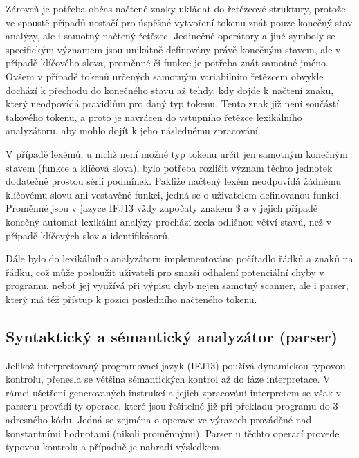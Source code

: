 \documentclass[12pt,a4paper,titlepage,final]{article}
\begin{document}
Zároveň je potřeba občas načtené znaky ukládat do řetězcové struktury, protože
ve spoustě případů nestačí pro úspěšné vytvoření tokenu znát pouze konečný 
stav analýzy, ale i samotný načtený řetězec. Jedinečné operátory a jiné 
symboly se specifickým významem jsou unikátně definovány právě konečným 
stavem, ale v případě klíčového slova, proměnné či funkce je potřeba znát 
samotné jméno. Ovšem v případě tokenů určených samotným variabilním řetězcem 
obvykle dochází k přechodu do konečného stavu až tehdy, kdy dojde k načtení 
znaku, který neodpovídá pravidlům pro daný typ tokenu. Tento znak již není 
součástí takového tokenu, a proto je navrácen do vstupního řetězce 
lexikálního analyzátoru, aby mohlo dojít k jeho následnému zpracování.

V případě lexémů, u nichž není možné typ tokenu určit jen samotným konečným 
stavem (funkce a klíčová slova), bylo potřeba rozlišit význam těchto jednotek 
dodatečně prostou sérií podmínek. Pakliže načtený lexém neodpovídá žádnému 
klíčovému slovu ani vestavěné funkci, jedná se o uživatelem definovanou funkci. 
Proměnné jsou v jazyce IFJ13 vždy započaty znakem \$ a v jejich případě konečný 
automat lexikální analýzy prochází zcela odlišnou větví stavů, než v případě 
klíčových slov a identifikátorů.

Dále bylo do lexikálního analyzátoru implementováno počítadlo řádků a znaků 
na řádku, což může posloužit uživateli pro snazší odhalení potenciální chyby 
v programu, neboť jej využívá při výpisu chyb nejen samotný scanner, ale i 
parser, který má též přístup k pozici posledního načteného tokenu.

\subsection{Syntaktický a sémantický analyzátor (parser)}
Jelikož interpretovaný programovací jazyk (IFJ13) používá dynamickou typovou 
kontrolu, pře\-ne\-sla se většina sémantických kontrol až do fáze interpretace. 
V rámci ušetření generovaných instrukcí a jejich zpracování interpretem se 
však v parseru provádí ty operace, které jsou řešitelné již při překladu 
programu do 3-adresného kódu. Jedná se zejména o operace ve výrazech prováděné 
nad konstantními hodnotami (nikoli proměnnými). Parser u těchto operací 
provede typovou kontrolu a případně je nahradí výsledkem.
\end{document}
